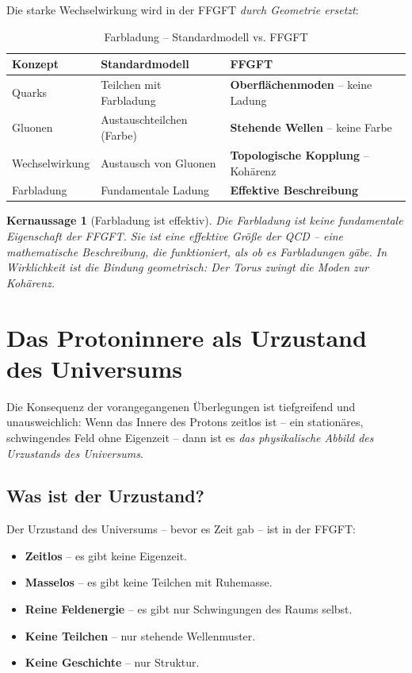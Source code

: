 \documentclass[11pt,a4paper]{article}
\newtheorem{keyresult}{Kernaussage}
\begin{document}
	Die starke Wechselwirkung wird in der FFGFT \emph{durch Geometrie ersetzt}:
	
	\begin{table}[ht]
		\centering
		\caption{Farbladung -- Standardmodell vs. FFGFT}
		\label{tab:farbe}
		\begin{tabular}{lll}
			\toprule
			Konzept & Standardmodell & FFGFT \\
			\midrule
			Quarks & Teilchen mit Farbladung & \textbf{Oberflächenmoden} -- keine Ladung \\
			Gluonen & Austauschteilchen (Farbe) & \textbf{Stehende Wellen} -- keine Farbe \\
			Wechselwirkung & Austausch von Gluonen & \textbf{Topologische Kopplung} -- Kohärenz \\
			Farbladung & Fundamentale Ladung & \textbf{Effektive Beschreibung} \\
			\bottomrule
		\end{tabular}
	\end{table}
	
	\begin{keyresult}[Farbladung ist effektiv]
		Die Farbladung ist keine fundamentale Eigenschaft der FFGFT. 
		Sie ist eine \emph{effektive Größe} der QCD -- eine mathematische Beschreibung, die funktioniert, \emph{als ob} es Farbladungen gäbe. 
		In Wirklichkeit ist die Bindung geometrisch: Der Torus zwingt die Moden zur Kohärenz.
	\end{keyresult}
	
	\section{Das Protoninnere als Urzustand des Universums}
	
	Die Konsequenz der vorangegangenen Überlegungen ist tiefgreifend und unausweichlich:
	Wenn das Innere des Protons zeitlos ist -- ein stationäres, schwingendes Feld ohne Eigenzeit -- 
	dann ist es \emph{das physikalische Abbild des Urzustands des Universums}.
	
	\subsection{Was ist der Urzustand?}
	
	Der Urzustand des Universums -- bevor es Zeit gab -- ist in der FFGFT:
	\begin{itemize}
		\item \textbf{Zeitlos} -- es gibt keine Eigenzeit.
		\item \textbf{Masselos} -- es gibt keine Teilchen mit Ruhemasse.
		\item \textbf{Reine Feldenergie} -- es gibt nur Schwingungen des Raums selbst.
		\item \textbf{Keine Teilchen} -- nur stehende Wellenmuster.
		\item \textbf{Keine Geschichte} -- nur Struktur.
	\end{itemize}
	
\end{document}
